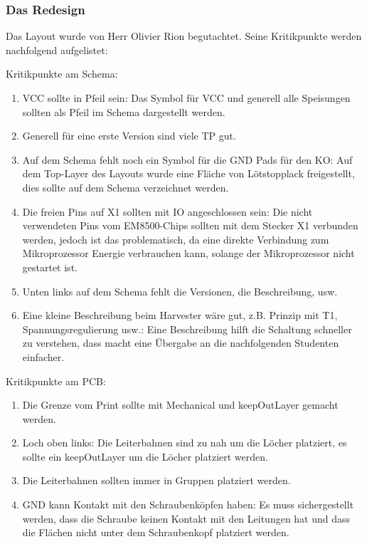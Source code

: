 \subsubsection{Das Redesign}

Das Layout wurde von Herr Olivier Rion begutachtet. Seine Kritikpunkte werden nachfolgend aufgelistet:

Kritikpunkte am Schema:
\begin{enumerate}
    \item VCC sollte in Pfeil sein: Das Symbol für VCC und generell alle Speisungen sollten als Pfeil im Schema dargestellt werden.
    \item Generell für eine erste Version sind viele TP gut.
    \item Auf dem Schema fehlt noch ein Symbol für die GND Pads für den KO: Auf dem Top-Layer des Layouts wurde eine Fläche von Lötstopplack freigestellt, dies sollte auf dem Schema verzeichnet werden.
	\item Die freien Pins auf X1 sollten mit IO angeschlossen sein: Die nicht verwendeten Pins vom EM8500-Chips sollten mit dem Stecker X1 verbunden werden, jedoch ist das problematisch, da eine direkte Verbindung zum Mikroprozessor Energie verbrauchen kann, solange der Mikroprozessor nicht gestartet ist.
	\item Unten links auf dem Schema fehlt die Versionen, die Beschreibung, usw.
	\item Eine kleine Beschreibung beim Harvester wäre gut, z.B. Prinzip mit T1, Spannungsregulierung usw.: Eine Beschreibung hilft die Schaltung schneller zu verstehen, dass macht eine Übergabe an die nachfolgenden Studenten einfacher.
\end{enumerate}

Kritikpunkte am PCB:
\begin{enumerate}
    \item Die Grenze vom Print sollte mit Mechanical und keepOutLayer gemacht werden.
    \item Loch oben links: Die Leiterbahnen sind zu nah um die Löcher platziert, es sollte ein keepOutLayer um die Löcher platziert werden.
    \item Die Leiterbahnen sollten immer in Gruppen platziert werden.
	\item GND kann Kontakt mit den Schraubenköpfen haben: Es muss sichergestellt werden, dass die Schraube keinen Kontakt mit den Leitungen hat und dass die Flächen nicht unter dem Schraubenkopf platziert werden. 
\end{enumerate}

